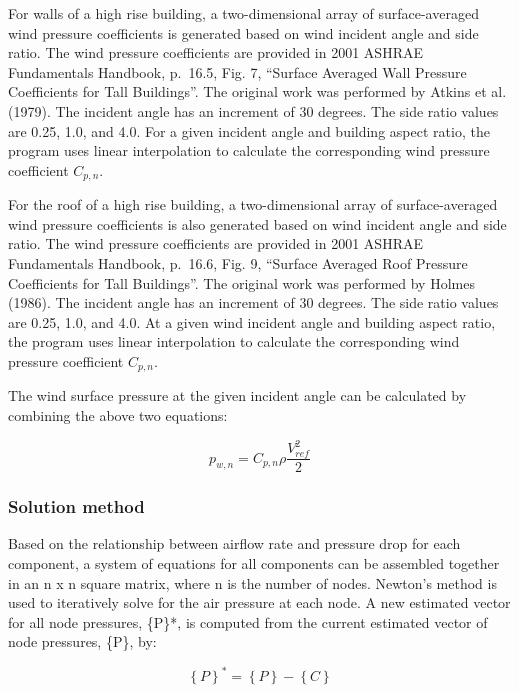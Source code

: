 For walls of a high rise building, a two-dimensional array of surface-averaged wind pressure coefficients is generated based on wind incident angle and side ratio. The wind pressure coefficients are provided in 2001 ASHRAE Fundamentals Handbook, p.~16.5, Fig. 7, ``Surface Averaged Wall Pressure Coefficients for Tall Buildings''. The original work was performed by Atkins et al. (1979). The incident angle has an increment of 30 degrees. The side ratio values are 0.25, 1.0, and 4.0. For a given incident angle and building aspect ratio, the program uses linear interpolation to calculate the corresponding wind pressure coefficient $C_{p,n}$.

For the roof of a high rise building, a two-dimensional array of surface-averaged wind pressure coefficients is also generated based on wind incident angle and side ratio. The wind pressure coefficients are provided in 2001 ASHRAE Fundamentals Handbook, p.~16.6, Fig. 9, ``Surface Averaged Roof Pressure Coefficients for Tall Buildings''. The original work was performed by Holmes (1986). The incident angle has an increment of 30 degrees. The side ratio values are 0.25, 1.0, and 4.0. At a given wind incident angle and building aspect ratio, the program uses linear interpolation to calculate the corresponding wind pressure coefficient $C_{p,n}$.

The wind surface pressure at the given incident angle can be calculated by combining the above two equations:

\begin{equation}
p_{w,n} = C_{p,n}\rho \frac{V_{ref}^2}{2}
\end{equation}

\subsubsection{Solution method}\label{solution-method}

Based on the relationship between airflow rate and pressure drop for each component, a system of equations for all components can be assembled together in an n x n square matrix, where n is the number of nodes. Newton's method is used to iteratively solve for the air pressure at each node. A new estimated vector for all node pressures, \{P\}*, is computed from the current estimated vector of node pressures, \{P\}, by:

\begin{equation}
{\left\{ P \right\}^*} = \left\{ P \right\} - \left\{ C \right\}
\end{equation}

